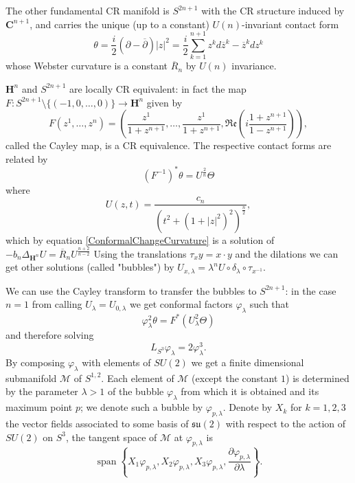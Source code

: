 \documentclass[a4paper,12pt]{amsart}
\renewcommand{\phi}{\varphi}
\newcommand{\de}{\partial}
\newcommand{\C}{\mathbf{C}}
\newcommand{\ci}[1]{\mathscr{#1}}%
\renewcommand{\H}{\mathbf{H}}
\newcommand{\g}[1]{\mathfrak{#1}}
\begin{document}
The other fundamental CR manifold is $S^{2n+1}$ with the CR structure induced by $\C^{n+1}$, and carries the unique (up to a constant) $U(n)$-invariant contact form
$$\theta= \frac{i}{2}(\de-\overline{\de})|z|^2 = \frac{i}{2}\sum_{k=1}^{n+1}z^kd\overline{z}^k-\overline{z}^kdz^k$$
whose Webster curvature is a constant $\overline{R}_n$ by $U(n)$ invariance.

$\H^n$ and $S^{2n+1}$ are locally CR equivalent: in fact the map $F:S^{2n+1}\setminus\{(-1,0,\ldots,0)\}\to\H^n$ given by
$$F(z^1,\ldots,z^n)= \left(\frac{z^1}{1+z^{n+1}},\ldots,\frac{z^1}{1+z^{n+1}},\g{Re}\left(i\frac{1+z^{n+1}}{1-z^{n+1}}\right)\right),$$
called the Cayley map, is a CR equivalence.
The respective contact forms are related by
$$(F^{-1})^*\theta= U^{\frac{2}{n}}\Theta$$
where
$$U(z,t)=\frac{c_n}{\left(t^2+(1+|z|^2)^2\right)^{\frac{n}{2}}},$$
which by equation \eqref{ConformalChangeCurvature} is a solution of $-b_n\Delta_{\H^n}U= \overline{R}_nU^{\frac{n+2}{n-2}}$
Using the translations $\tau_xy=x\cdot y$ and the dilations we can get other solutions (called "bubbles") by $U_{x,\lambda}=\lambda^nU\circ\delta_{\lambda}\circ\tau_{x^{-1}}$.

We can use the Cayley transform to transfer the bubbles to $S^{2n+1}$: in the case $n=1$ from calling $U_{\lambda}=U_{0,\lambda}$ we get conformal factors $\phi_{\lambda}$ such that
$$\phi_{\lambda}^2\theta=F^*(U_{\lambda}^2\Theta)$$
and therefore solving
\begin{equation}
 L_{S^3}\phi_{\lambda}= 2\phi_{\lambda}^3.
\end{equation}
By composing $\phi_{\lambda}$ with elements of $SU(2)$ we get a finite dimensional submanifold $\ci{M}$ of $S^{1,2}$. Each element of $\ci{M}$ (except the constant $1$) is determined by the parameter $\lambda>1$ of the bubble $\phi_{\lambda}$ from which it is obtained and its maximum point $p$; we denote such a bubble by $\phi_{p,\lambda}$. Denote by $X_k$ for $k=1,2,3$ the vector fields associated to some basis of $\g{su}(2)$ with respect to the action of $SU(2)$ on $S^3$, the tangent space of $\ci{M}$ at $\phi_{p,\lambda}$ is
$$\operatorname{span}\left\{X_1\phi_{p,\lambda}, X_2\phi_{p,\lambda},X_3\phi_{p,\lambda},\frac{\de\phi_{p,\lambda}}{\de\lambda}\right\}.$$

\vspace{8mm}
\end{document}
